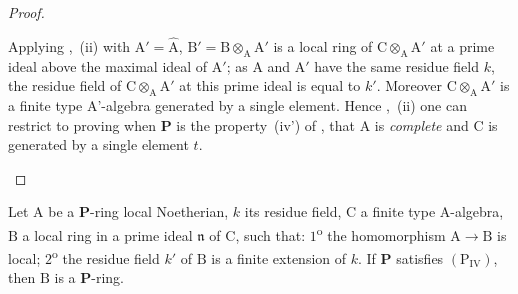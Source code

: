 \begin{proof}
\begin{enumerate}[label=(\roman*)]
  Applying ,~(ii) with $\mathrm{A}'=\widehat{\mathrm{A}}$, $\mathrm{B}'=\mathrm{B}\otimes_\mathrm{A}\mathrm{A}'$ is a local ring of $\mathrm{C}\otimes_\mathrm{A}\mathrm{A}'$ at a prime ideal above the maximal ideal of $\mathrm{A}'$; as $\mathrm{A}$ and $\mathrm{A}'$ have the same residue field $k$, the residue field of $\mathrm{C}\otimes_\mathrm{A}\mathrm{A}'$ at this prime ideal is equal to $k'$.
  Moreover $\mathrm{C}\otimes_\mathrm{A}\mathrm{A}'$ is a finite type A'-algebra generated by a single element.
  Hence ,~(ii) one can restrict to proving  when $\boldsymbol{P}$ is the property~(iv') of , that $\mathrm{A}$ is \emph{complete} and $\mathrm{C}$ is generated by a single element $t$.
\end{enumerate}
\end{proof}

\begin{lemma}[7.4.4.1]
\label{IV.7.4.4.1}
Let $\mathrm{A}$ be a $\boldsymbol{P}$-ring local Noetherian, $k$ its residue field, $\mathrm{C}$ a finite type A-algebra, $\mathrm{B}$ a local ring in a prime ideal $\mathfrak{n}$ of $\mathrm{C}$, such that:
$1$\textsuperscript{o} the homomorphism $\mathrm{A}\to\mathrm{B}$ is local; $2$\textsuperscript{o} the residue field $k'$ of $\mathrm{B}$ is a finite extension of $k$.
If $\boldsymbol{P}$ satisfies $(\mathrm{P_{IV}})$, then $\mathrm{B}$ is a $\boldsymbol{P}$-ring.
\end{lemma}

